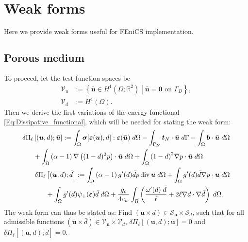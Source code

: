 \section{Weak forms }\label{sub:weak_form}
Here we provide weak forms useful for FEniCS implementation.

\subsection{Porous medium} \label{sub:weak_porous}
To proceed, let the test function spaces be
\begin{equation*}
    \begin{aligned}
        \mathscr{V}_u &:= \left\{\bar{\bm{u}}\in H^1\left(\Omega; \mathbb{R}^2\right) \middle|
        \bar{\bm{u}} = \mathbf{0} \text{ on } \Gamma_D
        \right\},\\
        \mathscr{V}_d &:= H^1(\Omega).
    \end{aligned}
\end{equation*}
Then we derive the first variations of the energy functional \eqref{Eq:Dissipative_functional}, which will be needed for stating the weak form:
\begin{subequations} \label{Eq:Residual}
    \begin{align}
	    \begin{split}
	    \label{Eq:Residual_u}\delta \Pi_\ell & \left[(\bm{u}, d); \bar{\bm{u}} \right]
	    := \int_\Omega \bm{\sigma}[\bm{\varepsilon}(\bm{u}), d] : \bm{\varepsilon}(\bar{\bm{u}}) \;d\Omega - \int_{\Gamma_N} \bm{t}_N\cdot \bar{\bm{u}} \; d\Gamma - \int_\Omega \bm{b} \cdot\bar{\bm{u}}\; d\Omega \\
	    &+\int_{\Omega} \left(\alpha-1\right) \nabla \left((1-d)^2  {p}\right) \cdot \bar{\bm{u}} \; d\Omega + \int_{\Omega}  {\left(1 - d\right)}^2\nabla {p}\cdot \bar{\bm{u}}  \; d\Omega
	    \end{split}\\
	    \begin{split}
	     \label{Eq:Residual_d}\delta \Pi_\ell & \left[(\bm{u}, d);  \bar{d} \right]
	    	    := \int_{\Omega} \left(\alpha-1\right)g'(d)\bar{d} {p} \operatorname{div}{\bm{u}} \; d\Omega +	\int_{\Omega} g'(d)\bar{d}   \nabla {p} \cdot {\bm{u}} \; d\Omega 
        \\
	    & + \int_\Omega g'(d) \psi_+(\bm{\varepsilon}) \bar{d}  \; d\Omega +
	    \frac{g_c}{4c_w} \int_\Omega  \left(\frac{\omega'(d)\;\bar{d}}{\ell} + 2\ell \nabla d\cdot\nabla \bar{d} \right)\;d\Omega.
	    \end{split}
	\end{align}
\end{subequations}
The weak form can thus be stated as: Find $\left(\bm{u}\times d \right)\in\mathscr{S}_{\bm{u}}\times\mathscr{S}_d$, such that for all admissible functions $\left(\bar{\bm{u}}\times\bar{d} \right)\in\mathscr{V}_{\bm{u}}\times\mathscr{V}_d$, $\delta\Pi_\ell\left[(\bm{u},d); \bar{\bm{u}}\right]=0$ and $\delta\Pi_\ell\left[(\bm{u},d); \bar{d}\right]=0$.


